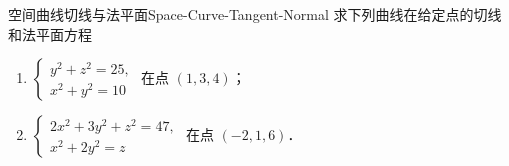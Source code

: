 \begin{problem}{空间曲线切线与法平面}{Space-Curve-Tangent-Normal}
    求下列曲线在给定点的切线和法平面方程
    \begin{enumerate}
        \item $\begin{cases} y^2 + z^2 = 25, \\ x^2 + y^2 = 10 \end{cases}$ 在点 $(1, 3, 4)$；
        \item $\begin{cases} 2x^2 + 3y^2 + z^2 = 47, \\ x^2 + 2y^2 = z \end{cases}$ 在点 $(-2, 1, 6)$．
    \end{enumerate}
\end{problem}

